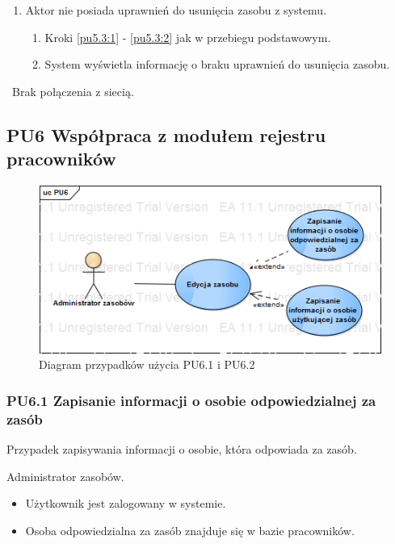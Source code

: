 \begin{enumerate}
\item Aktor nie posiada uprawnień do usunięcia zasobu z systemu.
	\begin{enumerate}[label*=\arabic*.]
		\item Kroki \ref{pu5.3:1} - \ref{pu5.3:2} jak w przebiegu podstawowym.
		\item System wyświetla informację o braku uprawnień do usunięcia zasobu.
	\end{enumerate}
\end{enumerate}

\
Brak połączenia z siecią.


\subsection{PU6 Współpraca z modułem rejestru pracowników} \label{pu6}
\begin{figure}[h!]
	\centering
	\includegraphics[scale=0.6]{img/diagrams/useCaseDiagrams/PU6.png}
	\caption{Diagram przypadków użycia PU6.1 i PU6.2 \label{fig:labelUCPU6}}
\end{figure}

\subsubsection{PU6.1 Zapisanie informacji o osobie odpowiedzialnej za zasób}
\myparagraph{Opis}
Przypadek zapisywania informacji o osobie, która odpowiada za zasób.

Administrator zasobów.

\begin{itemize}
\item Użytkownik jest zalogowany w systemie.
\item Osoba odpowiedzialna za zasób znajduje się w bazie pracowników.
\end{itemize}

